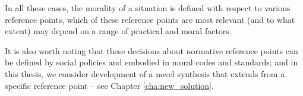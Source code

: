 
In all these cases, the morality of a situation is defined with respect to various reference points, which of these reference points are most relevant (and to what extent) may depend on a range of practical and moral factors.

It is also worth noting that these decisions about normative reference points can be defined by social policies %
 and embodied in moral codes and standards; and in this thesis, we consider development of a novel synthesis that extends from a specific reference point -- see Chapter \ref{cha:new_solution}. 







